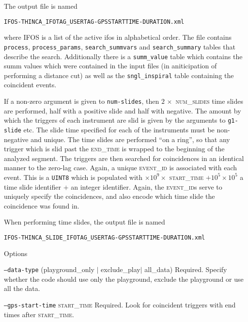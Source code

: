 \begin{entry}
The output file is named
\begin{center}
\texttt{IFOS-THINCA\_IFOTAG\_USERTAG-GPSSTARTTIME-DURATION.xml}\\
\end{center}
where \textsc{IFOS} is a list of the active ifos in alphabetical order.  The
file contains \texttt{process}, \texttt{process\_params},
\texttt{search\_summvars} and \texttt{search\_summary} tables that describe
the search.  Additionally there is a \texttt{summ\_value} table which contains
the summ values which were contained in the input files (in aniticipation of
performing a distance cut) as well as the \texttt{sngl\_inspiral} table
containing the coincident events.

If a non-zero argument is given to \texttt{num-slides}, then $2 \, \times$
\textsc{num\_slides} time slides are performed, half with a positive
slide and half with negative.  The amount by which the triggers of each
instrument are slid is given by the arguments to \texttt{g1-slide} etc.  The
slide time specified for each of the instruments must be non-negative and
unique.  The time slides are performed ``on a ring'', so that any trigger
which is slid past the \textsc{end\_time} is wrapped to the beginning of the
analyzed segment.  The triggers are then searched for coincidences in an
identical manner to the zero-lag case.  Again, a unique \textsc{event\_id} is
associated with each event.  This is a \texttt{UINT8} which is populated with
$\times 10^{9} \times$ \textsc{start\_time} $+ 10^{5} \times 10^{5}$ a time
slide identifier $+$ an integer identifier.  Again, the \textsc{event\_id}s
serve to uniquely specify the coincidences, and also encode which time slide
the coincidence was found in.  

When performing time slides, the output file is named 
\begin{center}
\texttt{IFOS-THINCA\_SLIDE\_IFOTAG\_USERTAG-GPSSTARTTIME-DURATION.xml}\\
\end{center}


\item[Options]\leavevmode
\begin{entry}

\item[\texttt{--data-type} (playground\_only $\mid$ exclude\_play$\mid$
all\_data)]
Required.  Specify whether the code should use only the playground, exclude
the playground or use all the data. 

\item[\texttt{--gps-start-time} \textsc{start\_time}] Required.  Look
for coincident triggers with end times after \textsc{start\_time}.


\end{entry}
\end{entry}
